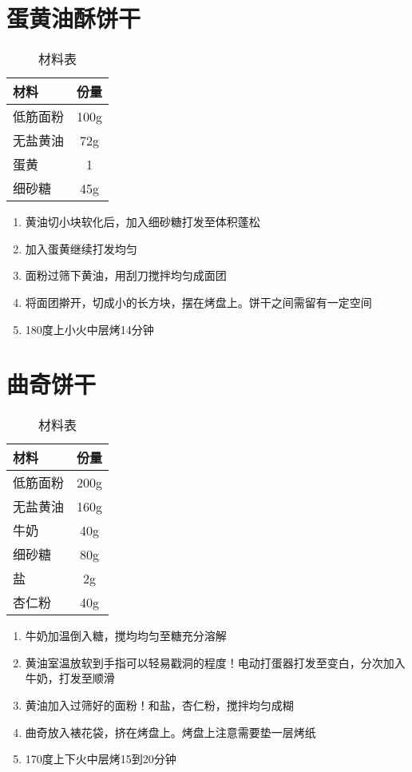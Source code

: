 \section{蛋黄油酥饼干}

\begin{table}[H]
    \centering
    \begin{tabular}{|l||c|}\hline
     \textbf{材料}    &  \textbf{份量}\\ \hline\hline
    低筋面粉 & 100g \\ \hline
    无盐黄油 &  72g \\ \hline
    蛋黄 & 1 \\ \hline
    细砂糖 & 45g \\ \hline
    \end{tabular}
    \caption{材料表}
\end{table}

\begin{enumerate}
    \item 黄油切小块软化后，加入细砂糖打发至体积蓬松
    \item 加入蛋黄继续打发均匀
    \item 面粉过筛下黄油，用刮刀搅拌均匀成面团
    \item 将面团擀开，切成小的长方块，摆在烤盘上。饼干之间需留有一定空间
    \item 180度上小火中层烤14分钟
\end{enumerate}


\section{曲奇饼干}

\begin{table}[H]
    \centering
    \begin{tabular}{|l||c|}\hline
     \textbf{材料}    &  \textbf{份量}\\ \hline\hline
    低筋面粉 & 200g \\ \hline
    无盐黄油 &  160g \\ \hline
    牛奶 & 40g \\ \hline
    细砂糖 &80g \\ \hline
    盐 & 2g \\ \hline
    杏仁粉 & 40g \\ \hline
    \end{tabular}
    \caption{材料表}
\end{table}

\begin{enumerate}
    \item 牛奶加温倒入糖，搅均均匀至糖充分溶解
    \item 黄油室温放软到手指可以轻易戳洞的程度！电动打蛋器打发至变白，分次加入牛奶，打发至顺滑
    \item 黄油加入过筛好的面粉！和盐，杏仁粉，搅拌均匀成糊
    \item 曲奇放入裱花袋，挤在烤盘上。烤盘上注意需要垫一层烤纸
    \item 170度上下火中层烤15到20分钟
\end{enumerate}


